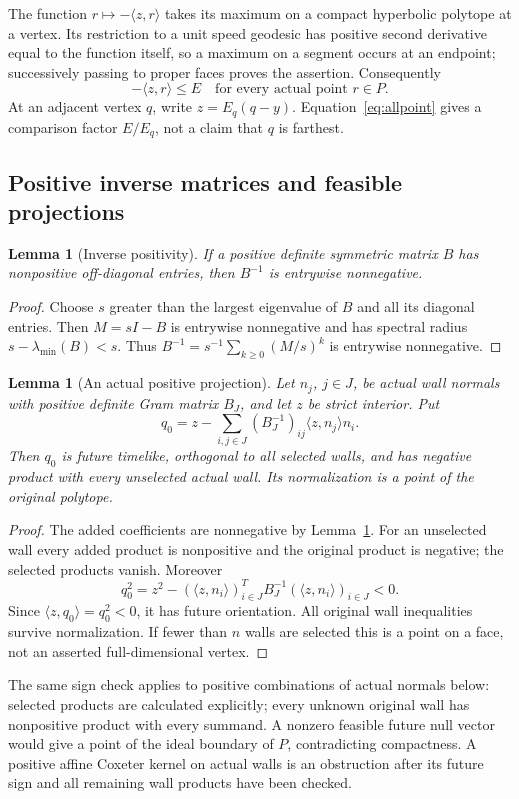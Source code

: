 \documentclass[11pt]{article}
\newtheorem{lemma}[theorem]{Lemma}
\theoremstyle{definition}
\theoremstyle{remark}
\newcommand{\ip}[2]{\langle #1,#2\rangle}
\begin{document}
The function \(r\mapsto-\ip{z}{r}\) takes its maximum on a compact
hyperbolic polytope at a vertex. Its restriction to a unit speed
geodesic has positive second derivative equal to the function itself,
so a maximum on a segment occurs at an endpoint; successively
passing to proper faces proves the assertion. Consequently
\begin{equation}
\label{eq:allpoint}
 -\ip{z}{r}\leq E\quad\text{for every actual point }r\in P.
\end{equation}
At an adjacent vertex \(q\), write \(z=E_q(q-y)\).
Equation~\eqref{eq:allpoint} gives a comparison factor \(E/E_q\),
not a claim that \(q\) is farthest.

\subsection{Positive inverse matrices and feasible projections}
\begin{lemma}[Inverse positivity]
\label{lem:inverse}
If a positive definite symmetric matrix \(B\) has nonpositive
off-diagonal entries, then \(B^{-1}\) is entrywise nonnegative.
\end{lemma}
\begin{proof}
Choose \(s\) greater than the largest eigenvalue of \(B\) and all its
diagonal entries. Then \(M=sI-B\) is entrywise nonnegative and has
spectral radius \(s-\lambda_{\min}(B)<s\). Thus
\(B^{-1}=s^{-1}\sum_{k\geq0}(M/s)^k\) is entrywise nonnegative.
\end{proof}
\begin{lemma}[An actual positive projection]
\label{lem:projection}
Let \(n_j\), \(j\in J\), be actual wall normals with positive
definite Gram matrix \(B_J\), and let \(z\) be strict interior.
Put
\[
 q_0=z-\sum_{i,j\in J}(B_J^{-1})_{ij}\ip{z}{n_j}n_i.
\]
Then \(q_0\) is future timelike, orthogonal to all selected walls,
and has negative product with every unselected actual wall.
Its normalization is a point of the original polytope.
\end{lemma}
\begin{proof}
The added coefficients are nonnegative by Lemma~\ref{lem:inverse}.
For an unselected wall every added product is nonpositive and the
original product is negative; the selected products vanish.
Moreover
\[
 q_0^2=z^2-
   (\ip{z}{n_i})_{i\in J}^{T}B_J^{-1}
   (\ip{z}{n_i})_{i\in J}<0.
\]
Since \(\ip{z}{q_0}=q_0^2<0\), it has future orientation.
All original wall inequalities survive normalization.
If fewer than \(n\) walls are selected this is a point on a face,
not an asserted full-dimensional vertex.
\end{proof}
The same sign check applies to positive combinations of actual
normals below: selected products are calculated explicitly; every
unknown original wall has nonpositive product with every summand.
A nonzero feasible future null vector would give a point of the
ideal boundary of \(P\), contradicting compactness. A positive
affine Coxeter kernel on actual walls is an obstruction after its
future sign and all remaining wall products have been checked.
\end{document}
